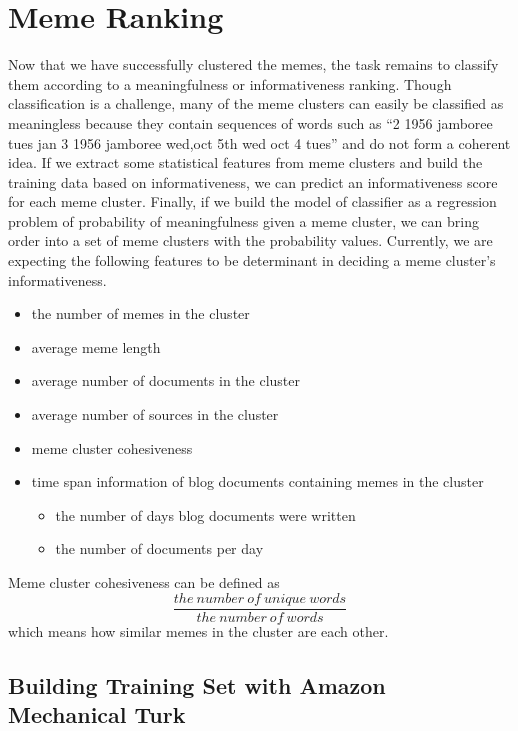 \documentclass{sig-alternate}
\begin{document}
\section{Meme Ranking}
Now that we have successfully clustered the memes, the task remains to classify them according to a meaningfulness or informativeness ranking. Though classification is a challenge, many of the meme clusters can easily be classified as meaningless because they contain sequences of words such as “2 1956 jamboree tues jan 3 1956 jamboree wed,oct 5th wed oct 4 tues” and do not form a coherent idea. If we extract some statistical features from meme clusters and build the training data based on informativeness, we can predict an informativeness score for each meme cluster. Finally, if we build the model of classifier as a regression problem of probability of meaningfulness given a meme cluster, we can bring order into a set of meme clusters with the probability values. Currently, we are expecting the following features to be determinant in deciding a meme cluster's informativeness.
\begin{itemize}
 \item the number of memes in the cluster
 \item average meme length
 \item average number of documents in the cluster
 \item average number of sources in the cluster
 \item meme cluster cohesiveness
 \item time span information of blog documents containing memes in the cluster
  \begin{itemize}
    \item the number of days blog documents were written
    \item the number of documents per day
  \end{itemize}
\end{itemize}
Meme cluster cohesiveness can be defined as 
\begin{displaymath}
\frac{the\ number\ of\ unique\ words}{the\ number\ of\ words}
\end{displaymath}
which means how similar memes in the cluster are each other.

\subsection{Building Training Set with Amazon Mechanical Turk}
\end{document}

